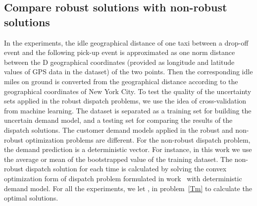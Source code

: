 \documentclass[10pt,twocolumn,twoside,english]{IEEEtran}
\begin{document}
\subsection{Compare robust solutions with non-robust solutions}
In the experiments,  the idle geographical distance of one taxi between a drop-off event and the following pick-up event is approximated as one norm distance between the D geographical coordinates (provided as longitude and latitude values of GPS data in the dataset) of the two points. Then the corresponding idle miles on ground is converted from the geographical distance according to the geographical coordinates of New York City. To test the quality of the uncertainty sets applied in the robust dispatch problems, we use the idea of cross-validation from machine learning. The dataset is separated as a training set for building the uncertain demand model, and a testing set for comparing the results of the dispatch solutions. The customer demand models applied in the robust and non-robust optimization problems are different. For the non-robust dispatch problem, the demand prediction  is a deterministic vector. For instance, in this work we use the average or mean of the bootstrapped value of the training dataset. The non-robust dispatch solution for each time  is calculated by solving the convex optimization form of dispatch problem formulated in work~\cite{taxi_Feiiccps15, Miao_tase16} with deterministic demand model. For all the experiments, we let ,  in problem~\eqref{Tm} to calculate the optimal solutions.
\end{document}
